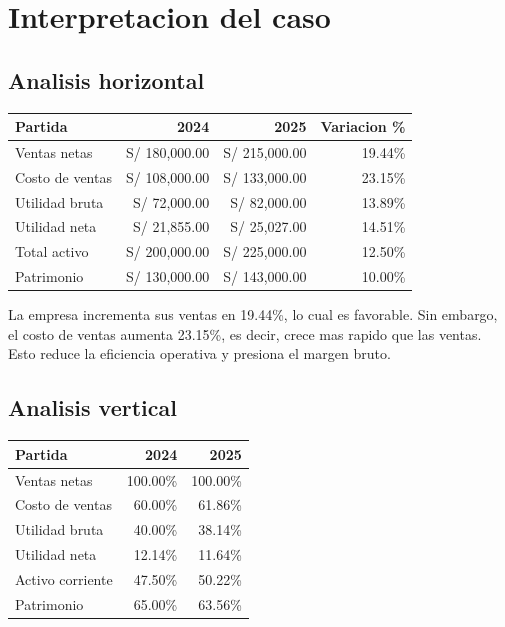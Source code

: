 \section{Interpretacion del caso}

\subsection{Analisis horizontal}

\begin{center}
\begin{tabular}{lrrr}
\toprule
Partida & 2024 & 2025 & Variacion \% \\
\midrule
Ventas netas & S/ 180,000.00 & S/ 215,000.00 & 19.44\% \\
Costo de ventas & S/ 108,000.00 & S/ 133,000.00 & 23.15\% \\
Utilidad bruta & S/ 72,000.00 & S/ 82,000.00 & 13.89\% \\
Utilidad neta & S/ 21,855.00 & S/ 25,027.00 & 14.51\% \\
Total activo & S/ 200,000.00 & S/ 225,000.00 & 12.50\% \\
Patrimonio & S/ 130,000.00 & S/ 143,000.00 & 10.00\% \\
\bottomrule
\end{tabular}
\end{center}

La empresa incrementa sus ventas en 19.44\%, lo cual es favorable. Sin embargo, el costo de ventas aumenta 23.15\%, es decir, crece mas rapido que las ventas. Esto reduce la eficiencia operativa y presiona el margen bruto.

\subsection{Analisis vertical}

\begin{center}
\begin{tabular}{lrr}
\toprule
Partida & 2024 & 2025 \\
\midrule
Ventas netas & 100.00\% & 100.00\% \\
Costo de ventas & 60.00\% & 61.86\% \\
Utilidad bruta & 40.00\% & 38.14\% \\
Utilidad neta & 12.14\% & 11.64\% \\
Activo corriente & 47.50\% & 50.22\% \\
Patrimonio & 65.00\% & 63.56\% \\
\bottomrule
\end{tabular}
\end{center}

